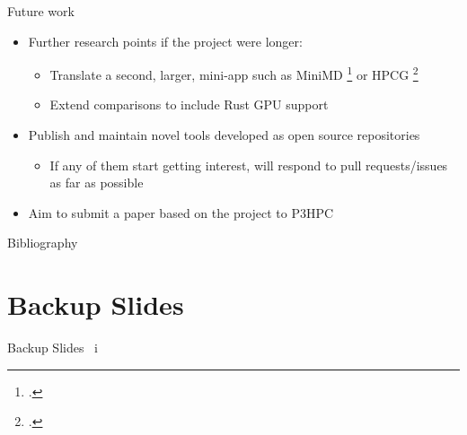 \documentclass[10pt,aspectratio=169]{beamer}
\begin{document}
\begin{frame}{Future work}
\begin{itemize}
    \item<1-> Further research points if the project were longer:
    \begin{itemize}
        \item Translate a second, larger, mini-app such as MiniMD \footcite{osti_1231191} or HPCG \footcite{dongarra2015hpcg}
        \item Extend comparisons to include Rust GPU support
    \end{itemize}
    \vspace{1cm}
    \item<2-> \alert{Publish and maintain novel tools developed} as open source repositories
    \begin{itemize}
        \item If any of them start getting interest, will respond to pull requests/issues as far as possible
    \end{itemize}
    \item<3-> \alert{Aim to submit a paper} based on the project to P3HPC
\end{itemize}
\end{frame}




\appendix

%   
%   

\begin{frame}[allowframebreaks]{Bibliography}
    \printbibliography[heading=none]
\end{frame}

\section{Backup Slides}

\begin{frame}{Backup Slides \ i}
\end{frame}

\end{document}
